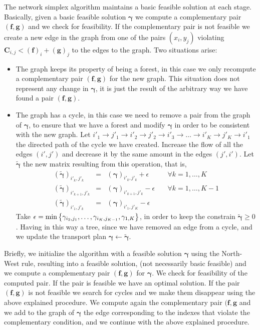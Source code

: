 The network simplex algorithm maintains a basic feasible solution at each stage. Basically, given a basic feasible solution $\pmb{\gamma}$ we compute a complementary pair $(\mathbf{f},\mathbf{g})$ and we check for feasibility. If the complementary pair is not feasible we create a new edge in the graph from one of the pairs $(x_i,y_j)$ violating $\mathbf{C}_{i,j}<(\mathbf{f})_i+(\mathbf{g})_j$ to the edges to the graph. Two situations arise:
\begin{itemize}
	\item The graph keeps its property of being a forest, in this case we only recompute a complementary pair $(\mathbf{f}, \mathbf{g})$ for the new graph. This situation does not represent any change in $\pmb{\gamma}$, it is just the result of the arbitrary way we have found a pair $(\mathbf{f}, \mathbf{g})$.
	\item The graph has a cycle, in this case we need to remove a pair from the graph of $\pmb{\gamma}$, to ensure that we have a forest and modify $\pmb{\gamma}$ in order to be consistent with the new graph. 
	Let $i'_1\to j'_1\to i'_2\to j'_2\to i'_3\to\dots\to i'_K\to j'_K\to i'_1$ the directed path of the cycle we have created. Increase the flow of all the edges $(i', j')$ and decrease it by the same amount in the edges $(j',i')$.
	Let $\tilde{\pmb{\gamma}}$ the new matrix resulting from this operation, that is,
	\begin{equation*}
		\begin{array}{lclc}
		(\tilde{\pmb{\gamma}})_{i'_k,j'_k}&=&({\pmb{\gamma}})_{i'_k,j'_k}+\epsilon&\quad \forall k=1,\dots, K\\
		(\tilde{\pmb{\gamma}})_{i'_{k+1}, j'_k}&=&({\pmb{\gamma}})_{i'_{k+1},j'_{k}}-\epsilon&\quad \forall k=1,\dots,K-1 \\
		(\tilde{\pmb{\gamma}})_{i'_1, j'_k}&=&({\pmb{\gamma}})_{i'_1,j'_{K}}-\epsilon&
		\end{array}
	\end{equation*}
	Take $\epsilon=\min\left\lbrace \gamma_{i_{2}, j_{1}},\dots, \gamma_{i_{K}, j_{K-1}},\gamma_{1,K} \right\rbrace$, in order to keep the constrain $\tilde{\pmb{\gamma}}\geq 0$. Having in this way a tree, since we have removed an edge from a cycle, and we update the transport plan $\pmb{\gamma}\leftarrow\tilde{\pmb{\gamma}}$.
\end{itemize}
Briefly, we initialize the algorithm with a feasible solution $\pmb{\gamma}$ using the North-West rule, resulting into a feasible solution, (not necessarily basic feasible) and we compute a complementary pair $(\mathbf{f},\mathbf{g})$ for $\pmb{\gamma}$. We check for feasibility of the computed pair. If the pair is feasible we have an optimal solution. If the pair $(\mathbf{f},\mathbf{g})$ is not feasible we search for cycles and we make them disappear using the above explained procedure. We compute again the complementary pair $(\mathbf{f}, \mathbf{g}$  and we add to the graph of $\pmb{\gamma}$ the edge corresponding to the indexes that violate the complementary condition, and we continue with the above explained procedure. 


